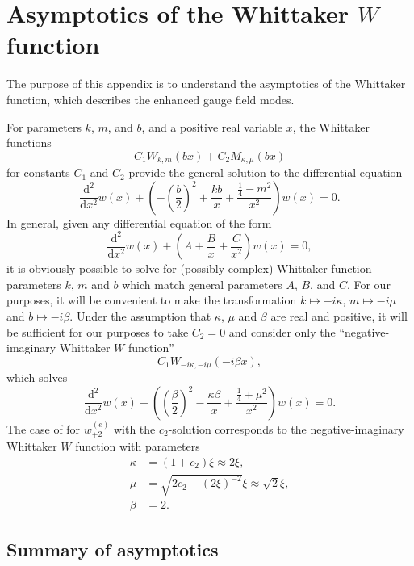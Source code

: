 
\section{Asymptotics of the Whittaker \texorpdfstring{$W$}{W} function\label{app:asymptotics}}

The purpose of this appendix is to understand the asymptotics of the Whittaker function, which describes the enhanced gauge field modes.

For parameters $k$, $m$, and $b$, and a positive real variable $x$, the Whittaker functions 
\[
C_{1}W_{k,m}(bx)+C_{2}M_{\kappa,\mu}(bx)
\]
 for constants $C_{1}$ and $C_{2}$ provide the general solution to the differential equation 
\[
\frac{\mathrm{d}^{2}}{\mathrm{d}x^{2}}w(x)+\left(-\left(\frac{b}{2}\right)^{2}+\frac{kb}{x}+\frac{\tfrac{1}{4}-m^{2}}{x^{2}}\right)w(x)=0.
\]
 In general, given any differential equation of the form 
\[
\frac{\mathrm{d}^{2}}{\mathrm{d}x^{2}}w(x)+\left(A+\frac{B}{x}+\frac{C}{x^{2}}\right)w(x)=0,
\]
 it is obviously possible to solve for (possibly complex) Whittaker function parameters $k$, $m$ and $b$ which match general parameters $A$, $B$, and $C$. For our purposes, it will be convenient to make the transformation $k\mapsto-i\kappa$, $m\mapsto-i\mu$ and $b\mapsto-i\beta$. Under the assumption that $\kappa$, $\mu$ and $\beta$ are real and positive, it will be sufficient for our purposes to take $C_{2}=0$ and consider only the ``negative-imaginary Whittaker $W$ function'' 
\[
C_{1}W_{-i\kappa,-i\mu}(-i\beta x),
\]
 which solves 
\begin{equation}
\frac{\mathrm{d}^{2}}{\mathrm{d}x^{2}}w(x)+\left(\left(\frac{\beta}{2}\right)^{2}-\frac{\kappa\beta}{x}+\frac{\tfrac{1}{4}+\mu^{2}}{x^{2}}\right)w(x)=0.\label{eq:whiteqn}
\end{equation}
 The case of  for $w_{+2}^{(e)}$ with the $c_{2}$-solution corresponds to the negative-imaginary Whittaker $W$ function with parameters
\begin{align}
\kappa & =(1+c_{2})\xi\approx2\xi,\label{eq:whitparams}\\
\mu & =\sqrt{2c_{2}-(2\xi)^{-2}}\xi\approx\sqrt{2}\xi,\nonumber \\
\beta & =2.\nonumber 
\end{align}


\subsection{Summary of asymptotics}


